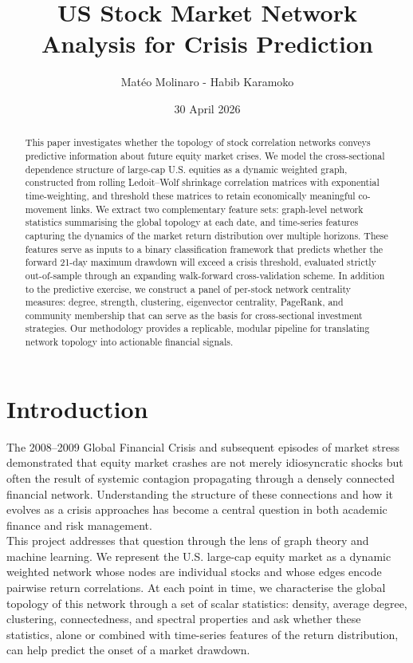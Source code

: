 \documentclass{article}
\title{US Stock Market Network Analysis for Crisis Prediction}
\author{Matéo Molinaro - Habib Karamoko}
\date{30 April 2026}
\begin{document}
\maketitle

\begin{abstract}
This paper investigates whether the topology of stock correlation networks conveys predictive information about future equity market crises. We model the cross-sectional dependence structure of large-cap U.S. equities as a dynamic weighted graph, constructed from rolling Ledoit--Wolf shrinkage correlation matrices with exponential time-weighting, and threshold these matrices to retain economically meaningful co-movement links. We extract two complementary feature sets: graph-level network statistics summarising the global topology at each date, and time-series features capturing the dynamics of the market return distribution over multiple horizons. These features serve as inputs to a binary classification framework that predicts whether the forward 21-day maximum drawdown will exceed a crisis threshold, evaluated strictly out-of-sample through an expanding walk-forward cross-validation scheme. In addition to the predictive exercise, we construct a panel of per-stock network centrality measures: degree, strength, clustering, eigenvector centrality, PageRank, and community membership that can serve as the basis for cross-sectional investment strategies. Our methodology provides a replicable, modular pipeline for translating network topology into actionable financial signals.
\end{abstract}

\tableofcontents
\newpage

\section{Introduction}

The 2008--2009 Global Financial Crisis and subsequent episodes of market stress demonstrated that equity market crashes are not merely idiosyncratic shocks but often the result of systemic contagion propagating through a densely connected financial network. Understanding the structure of these connections and how it evolves as a crisis approaches has become a central question in both academic finance and risk management.\\

This project addresses that question through the lens of graph theory and machine learning. We represent the U.S. large-cap equity market as a dynamic weighted network whose nodes are individual stocks and whose edges encode pairwise return correlations. At each point in time, we characterise the global topology of this network through a set of scalar statistics: density, average degree, clustering, connectedness, and spectral properties and ask whether these statistics, alone or combined with time-series features of the return distribution, can help predict the onset of a market drawdown.\\
\end{document}
